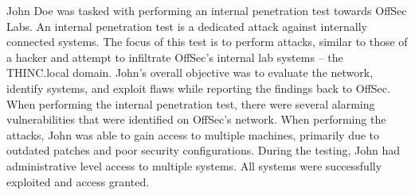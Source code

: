John Doe was tasked with performing an internal penetration test towards OffSec Labs. An internal penetration test is a dedicated attack against internally connected systems. The focus of this test is to perform attacks, similar to those of a hacker and attempt to infiltrate OffSec’s internal lab systems – the THINC.local domain. John’s overall objective was to evaluate the network, identify systems, and exploit flaws while reporting the findings back to OffSec. \\
When performing the internal penetration test, there were several alarming vulnerabilities that were identified on OffSec’s network. When performing the attacks, John was able to gain access to multiple machines, primarily due to outdated patches and poor security configurations.  During the testing, John had administrative level access to multiple systems. All systems were successfully exploited and access granted.
